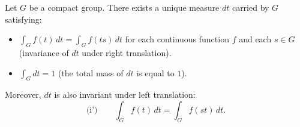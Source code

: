 Let $G$ be a compact group. There exists a unique measure $dt$ carried by $G$ satisfying:

\begin{itemize}
\item[(i)] $\displaystyle\int_G f(t)\,dt = \int_G f(ts)\,dt$ for each continuous function $f$ and each $s \in G$ (invariance of $dt$ under right translation).

\item[(ii)] $\displaystyle\int_G dt = 1$ (the total mass of $dt$ is equal to $1$).
\end{itemize}

Moreover, $dt$ is also invariant under left translation:
\[
\text{(i')}\qquad \int_G f(t)\,dt = \int_G f(st)\,dt.
\]
